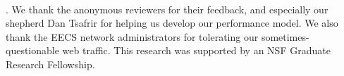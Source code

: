 ~\\
. We thank the anonymous reviewers for their
feedback, and especially our shepherd Dan Tsafrir for helping us develop our
performance model. We also thank the EECS network administrators for tolerating
our sometimes-questionable web traffic. This research was supported by an NSF Graduate Research
Fellowship.
